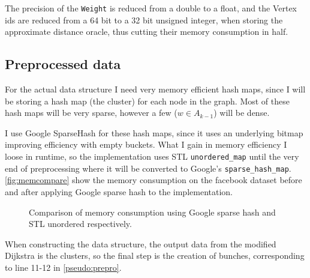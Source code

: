 The precision of the \texttt{Weight} is reduced from a double to a float, and
the Vertex ids are reduced from a 64 bit to a 32 bit unsigned integer, when
storing the approximate distance oracle, thus cutting their memory consumption
in half.

\subsection{Preprocessed data}

For the actual data structure I need very memory efficient hash maps, since I 
will be storing a hash map (the cluster) for each node in the graph. Most of
these hash maps will be very sparse, however a few ($w \in A_{k-1}$) will be
dense.

I use Google SparseHash for these hash maps, since it uses an underlying
bitmap improving efficiency with empty buckets. What I gain in memory
efficiency I loose in runtime, so the implementation uses STL
\texttt{unordered\_map} until the very end of preprocessing where it will be
converted to Google's \texttt{sparse\_hash\_map}. \autoref{fig:memcompare}
show the memory consumption on the facebook dataset before and after applying
Google sparse hash to the implementation.

\begin{figure}
    \centering
    \caption{Comparison of memory consumption using Google sparse hash and STL
        unordered respectively.}
    \label{fig:memcompare}
\end{figure}

When constructing the data structure, the output data from the modified
Dijkstra is the clusters, so the final step is the creation of bunches,
corresponding to line 11-12 in \autoref{pseudo:prepro}.

